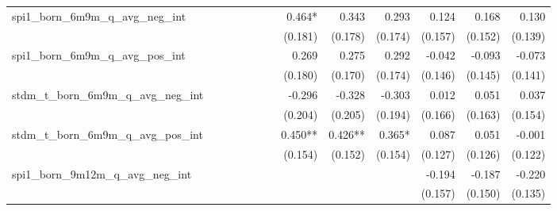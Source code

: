 \begin{tabular}{lrrrrrrrrrrrr}
spi1\_born\_6m9m\_q\_avg\_neg\_int          &              &              &              &              &              &              &       0.464* &        0.343 &        0.293 &        0.124 &        0.168 &        0.130 \\ 
                                            &              &              &              &              &              &              &      (0.181) &      (0.178) &      (0.174) &      (0.157) &      (0.152) &      (0.139) \\ 
spi1\_born\_6m9m\_q\_avg\_pos\_int          &              &              &              &              &              &              &        0.269 &        0.275 &        0.292 &       -0.042 &       -0.093 &       -0.073 \\ 
                                            &              &              &              &              &              &              &      (0.180) &      (0.170) &      (0.174) &      (0.146) &      (0.145) &      (0.141) \\ 
stdm\_t\_born\_6m9m\_q\_avg\_neg\_int       &              &              &              &              &              &              &       -0.296 &       -0.328 &       -0.303 &        0.012 &        0.051 &        0.037 \\ 
                                            &              &              &              &              &              &              &      (0.204) &      (0.205) &      (0.194) &      (0.166) &      (0.163) &      (0.154) \\ 
stdm\_t\_born\_6m9m\_q\_avg\_pos\_int       &              &              &              &              &              &              &      0.450** &      0.426** &       0.365* &        0.087 &        0.051 &       -0.001 \\ 
                                            &              &              &              &              &              &              &      (0.154) &      (0.152) &      (0.154) &      (0.127) &      (0.126) &      (0.122) \\ 
spi1\_born\_9m12m\_q\_avg\_neg\_int         &              &              &              &              &              &              &              &              &              &       -0.194 &       -0.187 &       -0.220 \\ 
                                            &              &              &              &              &              &              &              &              &              &      (0.157) &      (0.150) &      (0.135) \\ 

\end{tabular}
